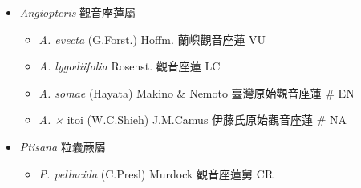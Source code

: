 
  \begin{itemize}
 \item[] \textit{Angiopteris} 觀音座蓮屬
                                
  \begin{itemize}
        \item[] \textit{A. evecta} (G.Forst.) Hoffm.  蘭嶼觀音座蓮   VU
        \item[] \textit{A. lygodiifolia} Rosenst.  觀音座蓮   LC
        \item[] \textit{A. somae} (Hayata) Makino \& Nemoto  臺灣原始觀音座蓮  \# EN
        \item[] \textit{A. ×} itoi \textit{} (W.C.Shieh) J.M.Camus 
                                        伊藤氏原始觀音座蓮  \# NA
  \end{itemize}
 \item[] \textit{Ptisana} 粒囊蕨屬
                                
  \begin{itemize}
        \item[] \textit{P. pellucida} (C.Presl) Murdock  觀音座蓮舅   CR
  \end{itemize}
  \end{itemize}
